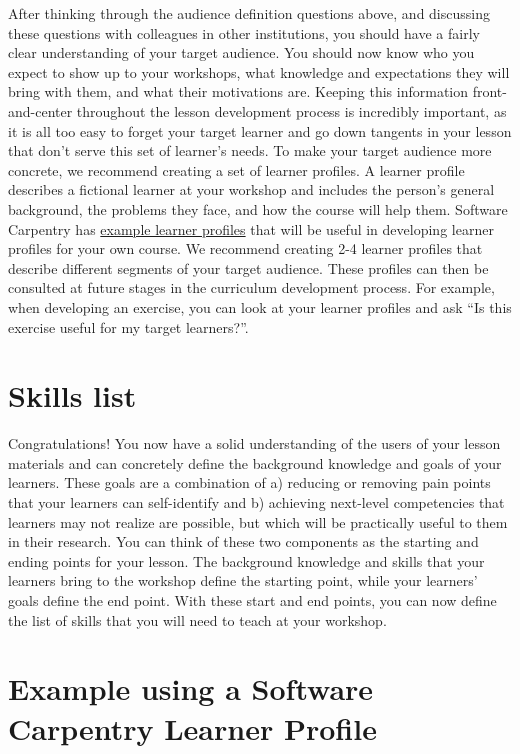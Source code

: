 \documentclass[
]{book}
\begin{document}
After thinking through the audience definition questions above, and discussing these questions with colleagues
in other institutions, you should have a fairly clear understanding of your target audience. You should now
know who you expect to show up to your workshops, what knowledge and expectations they will bring with them,
and what their motivations are. Keeping this information front-and-center throughout the lesson development
process is incredibly important, as it is all too easy to forget your target learner and go down tangents in
your lesson that don't serve this set of learner's needs. To make your target audience more concrete, we
recommend creating a set of learner profiles. A learner profile describes a fictional learner at your workshop
and includes the person's general background, the problems they face, and how the course will help them.
Software Carpentry has \href{https://carpentries.org/audience/}{example learner profiles} that will be useful
in developing learner profiles for your own course. We recommend creating 2-4 learner profiles that describe
different segments of your target audience. These profiles can then be consulted at future stages in the
curriculum development process. For example, when developing an exercise, you can look at your learner
profiles and ask ``Is this exercise useful for my target learners?''.

\hypertarget{skills-list}{%
\section{Skills list}\label{skills-list}}

Congratulations! You now have a solid understanding of the users of your lesson materials and can concretely
define the background knowledge and goals of your learners. These goals are a combination of a) reducing or
removing pain points that your learners can self-identify and b) achieving next-level competencies that
learners may not realize are possible, but which will be practically useful to them in their research.
You can think of these two components as the
starting and ending points for your lesson. The background knowledge and skills that your learners bring
to the workshop define the starting point, while your learners' goals define the end point. With these
start and end points, you can now define the list of skills that you will need to teach at your workshop.

\hypertarget{example-using-a-software-carpentry-learner-profile}{%
\section{Example using a Software Carpentry Learner Profile}\label{example-using-a-software-carpentry-learner-profile}}
\end{document}
